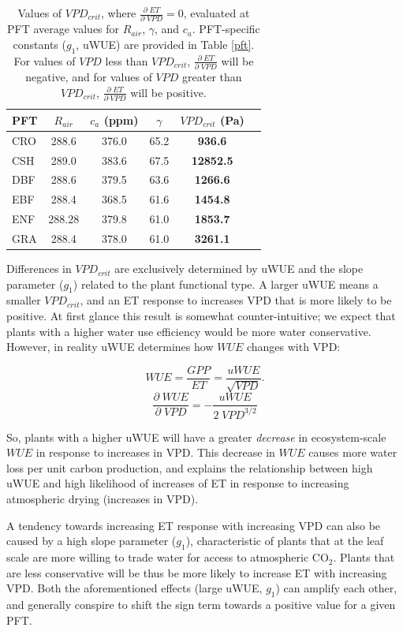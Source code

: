 \documentclass[draft,linenumbers]{gcbjournal}
\begin{document}
\begin{table}  
\caption{Values of $VPD_{crit}$, where $\frac{\partial \; ET}{\partial \; VPD} = 0$, evaluated at PFT average values for $R_{air}$, $\gamma$, and $c_a$. PFT-specific constants ($g_1$, uWUE) are provided in Table \ref{pft}. For values of $VPD$ less than $VPD_{crit}$, $\frac{\partial \; ET}{\partial \; VPD}$ will be negative, and for values of $VPD$ greater than $VPD_{crit}$, $\frac{\partial \; ET}{\partial \; VPD}$ will be positive.}
\centering
\begin{tabular}{l c c c c c}
  \hline
  PFT & $R_{air}$ & $c_a$ (ppm) & $\gamma$  & \textbf{$VPD_{crit}$ (Pa)} \\
  \hline
CRO & 288.6 & 376.0 & 65.2 &   \textbf{936.6} \\
CSH & 289.0 & 383.6 & 67.5 & \textbf{12852.5} \\
DBF & 288.6 & 379.5 & 63.6 &  \textbf{1266.6} \\
EBF & 288.4 & 368.5 & 61.6 &  \textbf{1454.8} \\
ENF & 288.28 & 379.8 & 61.0 &  \textbf{1853.7} \\
GRA & 288.4 & 378.0 & 61.0 &  \textbf{3261.1} \\
\hline
\end{tabular}
\label{vpd_crit}
\end{table}


Differences in $VPD_{crit}$ are exclusively determined by uWUE and the slope parameter ($g_1$) related to the plant functional type. A larger uWUE means a smaller $VPD_{crit}$, and an ET response to increases VPD that is more likely to be positive. At first glance this result is somewhat counter-intuitive; we expect that plants with a higher water use efficiency would be more water conservative. However, in reality uWUE determines how $WUE$ changes with VPD:

\[WUE = \frac{GPP}{ET} = \frac{uWUE}{\sqrt{VPD}}.\]
\[\frac{\partial \; WUE}{\partial \; VPD} = -\frac{uWUE}{2 \; VPD^{3/2}}\]

So, plants with a higher uWUE will have a greater \textit{decrease} in ecosystem-scale $WUE$ in response to increases in VPD. This decrease in $WUE$ causes more water loss per unit carbon production, and explains the relationship between high uWUE and high likelihood of increases of ET in response to increasing atmospheric drying (increases in VPD).

A tendency towards increasing ET response with increasing VPD can also be caused by a high slope parameter ($g_1$), characteristic of plants that at the leaf scale are more willing to trade water for access to atmospheric CO$_2$. Plants that are less conservative will be thus be more likely to increase ET with increasing VPD. Both the aforementioned effects (large uWUE, $g_1$) can amplify each other, and generally conspire to shift the sign term towards a positive value for a given PFT.
\end{document}

